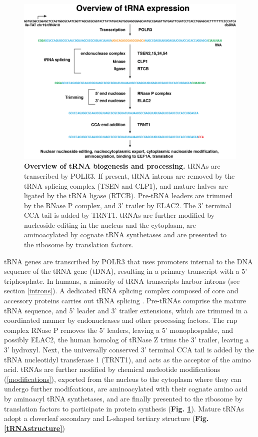 \documentclass[12pt]{rockefeller}
\begin{document}
\begin{figure}[!ht]%
\centering
\includegraphics[width=\textwidth]{biogenesis2.png}%
\caption[tRNA biogensis]{\textbf{Overview of tRNA biogenesis and processing.} tRNAs are transcribed by POLR3. If present, tRNA introns are removed by the tRNA splicing complex (TSEN and CLP1), and mature halves are ligated by the tRNA ligase (RTCB). Pre-tRNA leaders are trimmed by the RNase P complex, and 3' trailer by ELAC2. The 3' terminal CCA tail is added by TRNT1. tRNAs are further modified by nucleoside editing in the nucleus and the cytoplasm, are aminoacylated by cognate tRNA synthetases and are presented to the ribosome by translation factors.}
\label{biogenesis}%
\end{figure}

tRNA genes are transcribed by POLR3 that uses promoters internal to the DNA sequence of the tRNA gene (tDNA), resulting in a primary transcript with a 5' triphosphate. In humans, a minority of tRNA transcripts harbor introns (see section \ref{introns}). A dedicated tRNA splicing complex composed of core and accessory proteins carries out tRNA splicing \cite{trotta1999trna,Paushkin:2004wl,Weitzer:2007hda, Popow:2011ffa,Popow:2014ita}. Pre-tRNAs comprise the mature tRNA sequence, and 5' leader and 3' trailer extensions, which are trimmed in a coordinated manner by endonucleases and other processing factors. The \gls{rnp} complex RNase P removes the 5' leaders, leaving a 5' monophospahte, and possibly ELAC2, the human homolog of tRNase Z trims the 3' trailer, leaving a 3' \gls{hydroxyl}. Next, the universally conserved 3' terminal CCA tail is added by the tRNA nucleotidyl transferase 1 (TRNT1), and acts as the acceptor of the amino acid. tRNAs are further modified by chemical nucleotide modifications (\ref{modifications}), exported from the nucleus to the cytoplasm where they can undergo further modifcations, are aminoacylated with their cognate amino acid by aminoacyl tRNA synthetases, and are finally presented to the ribosome by translation factors to participate in protein synthesis (\textbf{Fig. \ref{biogenesis}})\cite{Phizicky:2010jf,Hopper:2010ho,Hopper:2013dl}. Mature tRNAs adopt a cloverleaf secondary and L-shaped tertiary structure (\textbf{Fig. \ref{tRNAstructure}})
\end{document}

